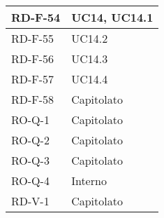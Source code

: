 \begin{center}
\begin{tabular}{ |m{8em}|m{13em}| }
    \hline
    RD-F-54  &  UC14, UC14.1 \\
    \hline
    RD-F-55  &  UC14.2 \\
    \hline
    RD-F-56  &  UC14.3 \\
    \hline
    RD-F-57  &  UC14.4 \\
    \hline
    RD-F-58  &  Capitolato \\
    \hline
    RO-Q-1  &  Capitolato \\
    \hline
    RO-Q-2  &  Capitolato \\
    \hline
    RO-Q-3  &  Capitolato \\
    \hline
    RO-Q-4  &  Interno \\
    \hline
    RD-V-1  &  Capitolato \\
    \hline
\end{tabular}
\end{center}